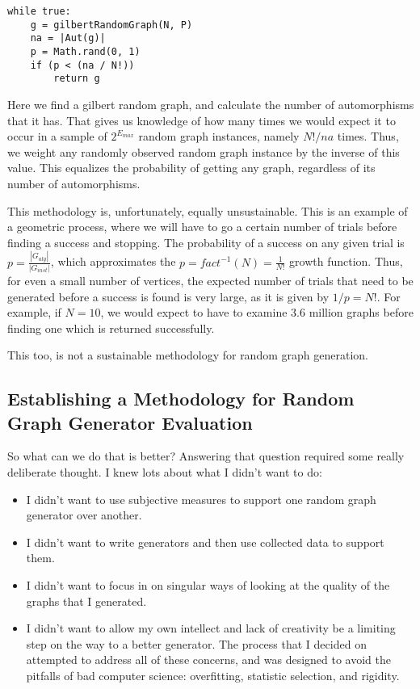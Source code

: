 \begin{lstlisting}[frame=single]
while true:
	g = gilbertRandomGraph(N, P)
	na = |Aut(g)|
	p = Math.rand(0, 1)
	if (p < (na / N!))
		return g
\end{lstlisting}

Here we find a gilbert random graph, and calculate the number of automorphisms that it has.
That gives us knowledge of how many times we would expect it to occur in a sample of $2^{E_{max}}$ random graph instances, namely $N! / na$ times.
Thus, we weight any randomly observed random graph instance by the inverse of this value.
This equalizes the probability of getting any graph, regardless of its number of automorphisms.

This methodology is, unfortunately, equally unsustainable.
This is an example of a geometric process, where we will have to go a certain number of trials before finding a success and stopping. 
The probability of a success on any given trial is $p = \frac{|G_{alg}|}{|G_{inst}|}$, which approximates the $p = fact^{-1}(N) = \frac{1}{N!}$ growth function.
Thus, for even a small number of vertices, the expected number of trials that need to be generated before a success is found is very large, as it is given by $1/p = N!$. 
For example, if $N=10$, we would expect to have to examine 3.6 million graphs before finding one which is returned successfully.

This too, is not a sustainable methodology for random graph generation.

\subsection{Establishing a Methodology for Random Graph Generator Evaluation}

So what can we do that is better?
Answering that question required some really deliberate thought.
I knew lots about what I didn't want to do:
\begin{itemize}
\item{I didn't want to use subjective measures to support one random graph generator over another.}
\item{I didn't want to write generators and then use collected data to support them.}
\item{I didn't want to focus in on singular ways of looking at the quality of the graphs that I generated.}
\item{I didn't want to allow my own intellect and lack of creativity be a limiting step on the way to a better generator.}
The process that I decided on attempted to address all of these concerns, and was designed to avoid the pitfalls of bad computer science: overfitting, statistic selection, and rigidity.
\end{itemize}

